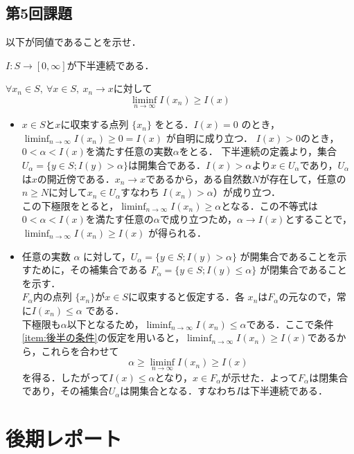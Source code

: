 \documentclass[dvipdfmx, leqno]{jsbook}
\begin{document}
\section{第5回課題}
\begin{tcolorbox}
	以下が同値であることを示せ．
\begin{enumerate_Alpha}
	\item $I\colon S\to [0, \infty]$が下半連続である．
	\item\label{item:後半の条件} $\forall x_n\in S,\ \forall x\in S,\ x_n\to x$に対して
\begin{equation*}
	\liminf_{n\to \infty} I(x_n)\ge I(x)
\end{equation*}
\end{enumerate_Alpha}
\end{tcolorbox}

\begin{souanswer} %
\begin{itemize}
	\item[$\Rightarrow$]
	$x\in S$と$x$に収束する点列 $\{x_n\}$ をとる．$I(x)=0$ のとき，$\liminf_{n\to\infty} I(x_n) \ge 0 = I
(x)$ が自明に成り立つ．
	$I(x)> 0$のとき，$0< \alpha< I(x)$を満たす任意の実数$\alpha$をとる．
	下半連続の定義より，集合$U_\alpha= \{y\in S; I(y)> \alpha\}$は開集合である．$I(x)> \alpha$より$x\in U_\alpha$であり，$U_\alpha$は$x$の開近傍である．$x_n \to x$であるから，ある自然数$N$が存在して，任意の$n\ge N$に対して$x_n\in U_\alpha$すなわち $I(x_n) > \alpha$）が成り立つ．\\
	この下極限をとると，$\liminf_{n\to \infty} I(x_n)\ge \alpha$となる．この不等式は$0< \alpha< I(x)$を満たす任意の$\alpha$で成り立つため，$\alpha\to I(x)$とすることで，$\liminf_{n\to \infty} I(x_n)\ge I(x)$ が得られる．
	\\
	\item[$\Leftarrow$]
	任意の実数 $\alpha$ に対して，$U_\alpha = \{y \in S ; I(y) > \alpha\}$ が開集合であることを示すために，その補集合である $F_\alpha = \{y \in S ; I(y) \le \alpha\}$ が閉集合であることを示す．\\
	$F_\alpha$内の点列 $\{x_n\}$が$x\in S$に収束すると仮定する．各 $x_n$は$F_\alpha$の元なので，常に$I(x_n)\le \alpha$ である．\\
	下極限も$\alpha$以下となるため，$\liminf_{n\to \infty} I(x_n)\le \alpha$である．ここで条件\ref{item:後半の条件}の仮定を用いると，$\liminf_{n\to \infty} I(x_n)\ge I(x)$であるから，これらを合わせて
\begin{equation}
	\alpha\ge \liminf_{n\to \infty} I(x_n) \ge I(x)
\end{equation}
	を得る．したがって$I(x)\le \alpha$となり，$x\in F_\alpha$が示せた．よって$F_\alpha$は閉集合であり，その補集合$U_\alpha$は開集合となる．すなわち$I$は下半連続である．
\end{itemize}
\end{souanswer}

\chapter{後期レポート}
\end{document}
